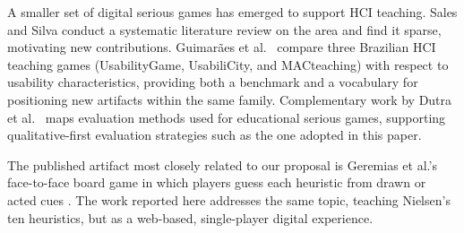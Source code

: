 A smaller set of digital serious games has emerged to support HCI teaching. Sales and Silva \cite{sales2020jogosserios} conduct a systematic literature review on the area and find it sparse, motivating new contributions. Guimar\~{a}es et al.\ \cite{guimaraes2022avaliacao} compare three Brazilian HCI teaching games (UsabilityGame, UsabiliCity, and MACteaching) with respect to usability characteristics, providing both a benchmark and a vocabulary for positioning new artifacts within the same family. Complementary work by Dutra et al.\ \cite{dutra2021mapeamento} maps evaluation methods used for educational serious games, supporting qualitative-first evaluation strategies such as the one adopted in this paper.

The published artifact most closely related to our proposal is Geremias et al.'s face-to-face board game in which players guess each heuristic from drawn or acted cues \cite{geremias2022desvendando}. The work reported here addresses the same topic, teaching Nielsen's ten heuristics, but as a web-based, single-player digital experience. %

